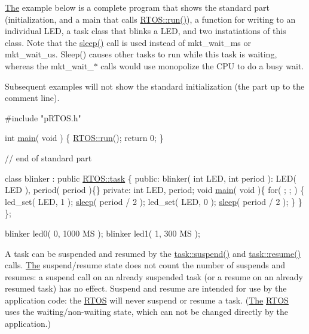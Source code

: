 \hyperlink{class_the}{The} example below is a complete program that shows the standard part (initialization, and a main that calls \hyperlink{class_r_t_o_s_a27731fa3169d3337e826ff0c9994c384}{R\+T\+O\+S\+::run()}), a function for writing to an individual L\+ED, a task class that blinks a L\+ED, and two instatiations of this class. Note that the \hyperlink{class_r_t_o_s_1_1task_a9d639b6f1147e0e3dbc603cdd8c52bd4}{sleep()} call is used instead of mkt\+\_\+wait\+\_\+ms or mkt\+\_\+wait\+\_\+us. Sleep() causes other tasks to run while this task is waiting, whereas the mkt\+\_\+wait\+\_\+$\ast$ calls would use monopolize the C\+PU to do a busy wait.

Subsequent examples will not show the standard initialization (the part up to the comment line).


\begin{DoxyCode}
\textcolor{preprocessor}{#include "pRTOS.h"}

\textcolor{keywordtype}{int} \hyperlink{class_r_t_o_s_1_1task_addc6d52f8792ddba1158d7ae5ef0037d}{main}( \textcolor{keywordtype}{void} ) \{
   \hyperlink{class_r_t_o_s_a27731fa3169d3337e826ff0c9994c384}{RTOS::run}();
   \textcolor{keywordflow}{return} 0;
\}

\textcolor{comment}{// end of standard part}

\textcolor{keyword}{class }blinker : \textcolor{keyword}{public} \hyperlink{class_r_t_o_s_1_1task}{RTOS::task} \{
\textcolor{keyword}{public}:
   blinker( \textcolor{keywordtype}{int} LED, \textcolor{keywordtype}{int} period ):
      LED( LED ), period( period )\{\}
\textcolor{keyword}{private}:
   \textcolor{keywordtype}{int} LED, period;
   \textcolor{keywordtype}{void} \hyperlink{class_r_t_o_s_1_1task_addc6d52f8792ddba1158d7ae5ef0037d}{main}( \textcolor{keywordtype}{void} )\{
      \textcolor{keywordflow}{for}( ; ; ) \{
         led\_set( LED, 1 );
         \hyperlink{class_r_t_o_s_1_1task_a9d639b6f1147e0e3dbc603cdd8c52bd4}{sleep}( period / 2 );
         led\_set( LED, 0 );
         \hyperlink{class_r_t_o_s_1_1task_a9d639b6f1147e0e3dbc603cdd8c52bd4}{sleep}( period / 2 );
      \}
   \}
\};

blinker led0( 0, 1000 MS );
blinker led1( 1,  300 MS );
\end{DoxyCode}


A task can be suspended and resumed by the \hyperlink{class_r_t_o_s_1_1task_a2e0e3c92d9479336535a2ef877103f36}{task\+::suspend()} and \hyperlink{class_r_t_o_s_1_1task_a841b14aaab18d883959f034510dd9376}{task\+::resume()} calls. \hyperlink{class_the}{The} suspend/resume state does not count the number of suspends and resumes\+: a suspend call on an already suspended task (or a resume on an already resumed task) has no effect. Suspend and resume are intended for use by the application code\+: the \hyperlink{class_r_t_o_s}{R\+T\+OS} will never suspend or resume a task. (\hyperlink{class_the}{The} \hyperlink{class_r_t_o_s}{R\+T\+OS} uses the waiting/non-\/waiting state, which can not be changed directly by the application.)

